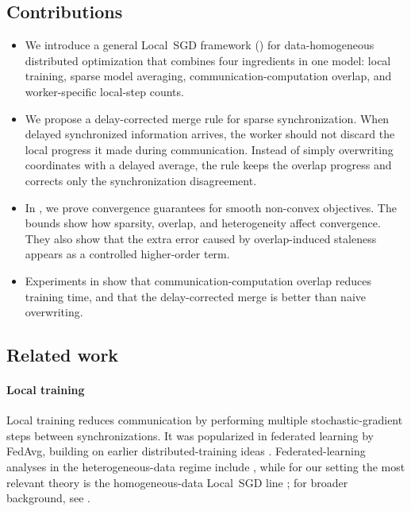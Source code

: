 \documentclass{article}
\theoremstyle{plain}
\theoremstyle{definition}
\newcommand{\algname}[1]{{\color{alggray}\small\sf#1}\xspace}
\newcommand{\minibatch}{\algname{Minibatch~SGD}}
\newcommand{\fedavg}{\algname{FedAvg}}
\newcommand{\localsgd}{\algname{Local~SGD}}
\begin{document}
\subsection{Contributions}\label{sub:contributions}
% 
\begin{itemize}
    \item
    We introduce a general \localsgd framework () for data-homogeneous distributed optimization that combines four ingredients in one model:
    local training, sparse model averaging, communication-computation overlap, and worker-specific local-step counts.

    \item
    We propose a delay-corrected merge rule for sparse synchronization.
    When delayed synchronized information arrives, the worker should not discard the local progress it made during communication.
    Instead of simply overwriting coordinates with a delayed average, the rule keeps the overlap progress and corrects only the synchronization disagreement.

    \item
    In , we prove convergence guarantees for smooth non-convex objectives.
    The bounds show how sparsity, overlap, and heterogeneity affect convergence.
    They also show that the extra error caused by overlap-induced staleness appears as a controlled higher-order term.


    \item
    Experiments in  show that communication-computation overlap reduces training time, and that the delay-corrected merge is better than naive overwriting.
\end{itemize}
% 
% 
% 
\subsection{Related work}\label{sub:related_literature}
% 
\paragraph{Local training}
Local training reduces communication by performing multiple stochastic-gradient steps between synchronizations.
It was popularized in federated learning by \fedavg \citep{mcmahan2017communication}, building on earlier distributed-training ideas \citep{zinkevich2010parallelized, povey2014parallel, moritz2015sparknet}.
Federated-learning analyses in the heterogeneous-data regime include \citep{li2020onfedavg, karimireddy2020scaffold, mishchenko2022proxskip, douillard2023diloco}, while for our setting the most relevant theory is the homogeneous-data \localsgd line \citep{yu2019parallel, haddadpour2019localsgd, wang2021cooperative, woodworth2020local}; for broader background, see \citet{malinovsky2022variance}.
\end{document}
